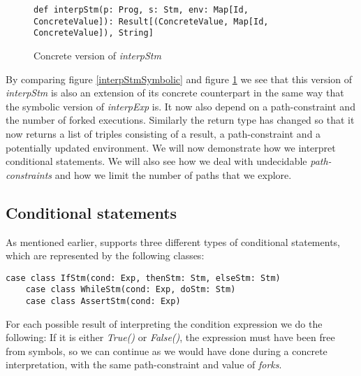 \begin{figure}[!h]
	\begin{lstlisting}[style=simple]
		def interpStm(p: Prog, s: Stm, env: Map[Id, ConcreteValue]): Result[(ConcreteValue, Map[Id, ConcreteValue]), String]
	\end{lstlisting}
	\caption{Concrete version of \textsl{interpStm}}
	\label{interpStmConcrete}
\end{figure}
By comparing figure \ref{interpStmSymbolic} and figure \ref{interpStmConcrete} we see that this version of \textsl{interpStm} is also an extension of its concrete counterpart in the same way that the symbolic version of \textsl{interpExp} is. It now also depend on a path-constraint and the number of forked executions. Similarly the return type has changed so that it now returns a list of triples consisting of a result, a path-constraint and a potentially updated environment. We will now demonstrate how we interpret conditional statements. We will also see how we deal with undecidable \emph{path-constraints} and how we limit the number of paths that we explore.


\iffalse

\subsection{Assignment statements}
Given an \textsl{Assignment}-statement \textsl{AssignStm(v: Var, e: Exp)}, we interpret the expression $e$, and get a list of results for each possible execution path. For each of these results, we return the value of the expression and an updated environment. If the expression resulted in an error, or a unit 
value, we instead return error and the original environment. 

\fi

\subsection{Conditional statements}

As mentioned earlier, \explanguage supports three different types of conditional statements, which are represented by the following classes:

\begin{lstlisting}[style=simple]
	case class IfStm(cond: Exp, thenStm: Stm, elseStm: Stm)
	case class WhileStm(cond: Exp, doStm: Stm)
	case class AssertStm(cond: Exp)
\end{lstlisting}
For each possible result of interpreting the condition expression we do the following: If it is either \textsl{True()} or \textsl{False()}, the expression must have been free from symbols, so we can continue as we would have done during a concrete interpretation, with the same path-constraint and value of \textsl{forks}.

